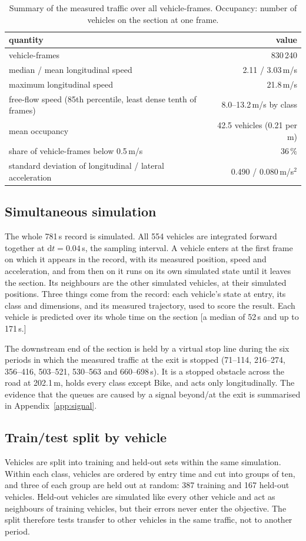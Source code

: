 \documentclass[11pt]{article}
\begin{document}
\begin{table}[H]\centering\footnotesize
\caption{Summary of the measured traffic over all vehicle-frames. Occupancy:
number of vehicles on the section at one frame.}
\label{tab:stats}
\begin{tabular}{@{}lr@{}}
\toprule
quantity & value\\
\midrule
vehicle-frames & 830\,240\\
median / mean longitudinal speed & 2.11 / 3.03\,m/s\\
maximum longitudinal speed & 21.8\,m/s\\
free-flow speed (85th percentile, least dense tenth of frames) & 8.0--13.2\,m/s by class\\
mean occupancy & 42.5 vehicles (0.21 per m)\\
share of vehicle-frames below 0.5\,m/s & $36\,\%$\\
standard deviation of longitudinal / lateral acceleration & 0.490 / 0.080\,m/s$^2$\\
\bottomrule
\end{tabular}
\end{table}

\subsection{Simultaneous simulation}
The whole 781\,s record is simulated. All 554
vehicles are integrated forward together at $\mathrm{d}t=0.04$\,s, the
sampling interval. A vehicle enters at the first frame on which it appears in
the record, with its measured position, speed and acceleration, and from then
on it runs on its own simulated state until it leaves the section. Its
neighbours are the other simulated vehicles, at their simulated positions.
Three things come from the record: each vehicle's state at entry, its class and
dimensions, and its measured trajectory, used to score the result. Each vehicle
is predicted over its whole time on the section [a median of 52\,s and up to
171\,s.]

The downstream end of the section is held by a virtual stop line during the
six periods in which the measured traffic at the exit is stopped (71--114,
216--274, 356--416, 503--521, 530--563 and 660--698\,s). It is a stopped
obstacle across the road at 202.1\,m, holds every class except Bike, and acts
only longitudinally. The evidence that the queues are caused by a signal beyond/at
the exit is summarised in Appendix~\ref{app:signal}.

\subsection{Train/test split by vehicle}
\label{sec:split}
Vehicles are split into training and held-out sets within the same simulation.
Within each class, vehicles are ordered by entry time and cut into groups of
ten, and three of each group are held out at random: 387 training and 167
held-out vehicles. Held-out vehicles are simulated like every other vehicle and
act as neighbours of training vehicles, but their errors never enter the
objective. The split therefore tests transfer to other vehicles in the same
traffic, not to another period.
\end{document}
